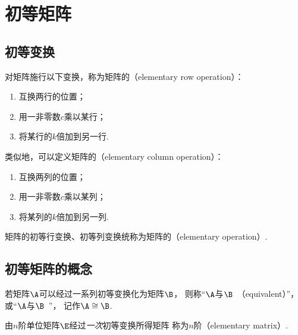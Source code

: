 \section{初等矩阵}
\subsection{初等变换}
\begin{definition}
对矩阵施行以下变换，称为矩阵的（elementary row operation）：
\begin{enumerate}
	\item 互换两行的位置；
	\item 用一非零数\(c\)乘以某行；
	\item 将某行的\(k\)倍加到另一行.
\end{enumerate}
类似地，可以定义矩阵的（elementary column operation）：
\begin{enumerate}
	\item 互换两列的位置；
	\item 用一非零数\(c\)乘以某列；
	\item 将某列的\(k\)倍加到另一列.
\end{enumerate}
矩阵的初等行变换、初等列变换统称为矩阵的（elementary operation）.
\end{definition}


\subsection{初等矩阵的概念}
\begin{definition}\label{definition:逆矩阵.矩阵等价}
若矩阵\(\A\)可以经过一系列初等变换化为矩阵\(\B\)，
则称“\(\A\)与\(\B\)~（equivalent）”，
或“\(\A\)与\(\B\)~”，
记作\(\A\cong\B\).
\end{definition}

\begin{definition}
由\(n\)阶单位矩阵\(\E\)经过\emph{一次}初等变换所得矩阵
称为\(n\)阶（elementary matrix）.
\end{definition}

